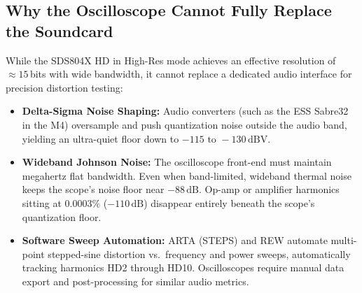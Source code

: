 \documentclass[11pt, letterpaper]{article}
\begin{document}
\subsection{Why the Oscilloscope Cannot Fully Replace the Soundcard}
While the SDS804X HD in High-Res mode achieves an effective resolution of $\approx 15$\,bits with wide bandwidth, it cannot replace a dedicated audio interface for precision distortion testing:
\begin{itemize}[leftmargin=1.5em]
    \item \textbf{Delta-Sigma Noise Shaping:} Audio converters (such as the ESS Sabre32 in the M4) oversample and push quantization noise outside the audio band, yielding an ultra-quiet floor down to $-115\text{ to } -130\,\text{dBV}$.
    \item \textbf{Wideband Johnson Noise:} The oscilloscope front-end must maintain megahertz flat bandwidth. Even when band-limited, wideband thermal noise keeps the scope's noise floor near $-88\,\text{dB}$. Op-amp or amplifier harmonics sitting at $0.0003\%$ ($-110\,\text{dB}$) disappear entirely beneath the scope's quantization floor.
    \item \textbf{Software Sweep Automation:} ARTA (STEPS) and REW automate multi-point stepped-sine distortion vs.\ frequency and power sweeps, automatically tracking harmonics HD2 through HD10. Oscilloscopes require manual data export and post-processing for similar audio metrics.
\end{itemize}
\end{document}
